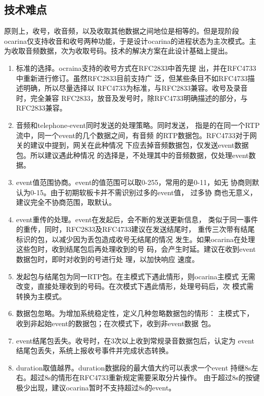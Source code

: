 \documentclass[11pt]{article}
\begin{document}
\subsection{技术难点}
    原则上，收号，收音频，以及收取其他数据之间地位是相等的。但是现阶段
ocarina仅支持收音和收号两种功能，于是设计ocarina的进程状态为主次模式。主
为收取音频数据，次为收取号码。技术的解决方案在此设计基础上提出。
    \begin{enumerate}
    \item 标准的选择。ocraina支持的收号方式在RFC2833中首先提
        出，并在RFC4733中重新进行修订。虽然RFC2833目前支持广
        泛，但某些条目不如RFC4733描述明确，所以尽量选择以
        RFC4733为标准，与RFC2833兼容。收号及录音时，完全兼容
        RFC2833，放音及发号时，除RFC4733明确描述的部分，与
        RFC2833兼容。
    \item 音频和telephone-event同时发送的处理策略。同时发送，
        指是的在同一个RTP流中，同一个event的几个数据之间，有音频
        的RTP数据包。RFC4733对于网关的建议中提到，网关在此种情况
        下应去掉音频数据包，仅发送event数据包。所以建议遇此种情况
        的选择是，不处理其中的音频数据，仅处理event数据。
    \item event值范围协商。event的值范围可以取0-255，常用的是0-11，如无
        协商则默认为0-15。由于初期软板卡并不需识别过多的event值， 过多协
        商也无意义，建议完全不协商范围，取默认。
    \item event重传的处理。event在发起后，会不断的发送更新信息，
        类似于同一事件的重传，同时，RFC2833及RFC4733建议在发送结尾时，
        重传三次带有结尾标识的包，以减少因为丢包造成收号无结尾的情况
        发生。如果ocarina在处理这些包时，收到结尾包后再处理收到的号
        码，会产生时延。建议在收到event数据包时，即时对收到的号进行处
        理，以加快响应 速度。
    \item 发起包与结尾包为同一RTP包。在主模式下遇此情形，则ocarina主模式
        无需改变，直接处理收到的号码。在次模式下遇此情形，处理号码后，次
        模式需转换为主模式。
    \item 数据包忽略。为增加系统稳定性，定义几种忽略数据包的情形：
        主模式下，收到非起始event的数据包；在次模式下，收到非event数据
        包。
    \item event结尾包丢失。收号时，在3次以上收到常规录音数据包后，认定为
        event结尾包丢失，系统上报收号事件并完成状态转换。
    \item duration取值越界。duration数据段的最大值大约可以表求一个event
        持继8s左右。超过8s的情形在RFC4733重新规定需要采取分片操作。
        由于超过8s的按键极少出现，建议ocarina暂时不支持超过8s的event。
    \end{enumerate}
    
\end{document}
